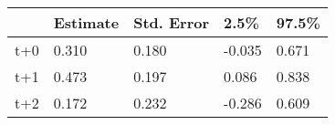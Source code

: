 \begin{tabular}{lllll}
  \toprule
  & Estimate & Std. Error & 2.5\% & 97.5\% \\ 
  \midrule
t+0 & 0.310 & 0.180 & -0.035 & 0.671 \\ 
  t+1 & 0.473 & 0.197 & 0.086 & 0.838 \\ 
  t+2 & 0.172 & 0.232 & -0.286 & 0.609 \\ 
   \bottomrule
\end{tabular}
